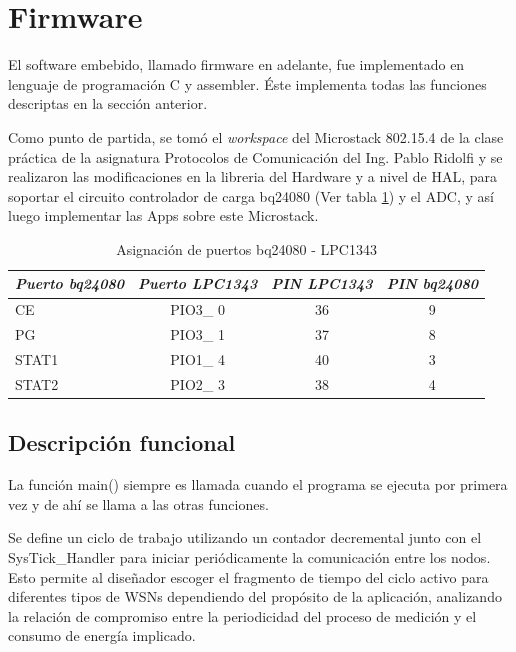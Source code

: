 {\section{Firmware}
\label{sec:firm}
El software embebido, llamado firmware en adelante, fue implementado en lenguaje de programación C y assembler. Éste implementa todas las funciones descriptas en la sección anterior.
 
Como punto de partida, se tomó el \textit{workspace} del Microstack 802.15.4 de la clase práctica de la asignatura Protocolos de Comunicación del Ing. Pablo Ridolfi y se realizaron las modificaciones en la libreria del Hardware y a nivel de HAL, para soportar el circuito controlador de carga bq24080 (Ver tabla \ref{tab:bq}) y el ADC, y así luego implementar las Apps sobre este Microstack.

\begin{table}[ht]
	\centering
	\caption{Asignación de puertos bq24080 - LPC1343}
	\begin{tabular}{@{} l *3c @{}}    \toprule
		\emph{\textbf{Puerto bq24080}} & \emph{\textbf{Puerto LPC1343}} & \emph{\textbf{PIN LPC1343}} & \emph{\textbf{PIN bq24080}}\\
		\midrule
		CE &  PIO3\_ 0 & 36 & 9	\\	
		PG	&  PIO3\_ 1 & 37 & 8\\
		STAT1 &  PIO1\_ 4 & 40 & 3\\
		STAT2 &  PIO2\_ 3 & 38 & 4\\
		\bottomrule
		\hline
	\end{tabular}
	\label{tab:bq}
\end{table}

\subsection{Descripción funcional}
\label{subsec:func} 
La función main() siempre es llamada cuando el programa se ejecuta por primera vez y de ahí se llama a las otras funciones.

Se define un ciclo de trabajo utilizando un contador decremental junto con el SysTick\_Handler para iniciar periódicamente la comunicación entre los nodos. Esto permite al diseñador escoger el fragmento de tiempo del ciclo activo para diferentes tipos de WSNs dependiendo del propósito de la aplicación, analizando la relación de compromiso entre la periodicidad del proceso de medición y el consumo de energía implicado.

}
